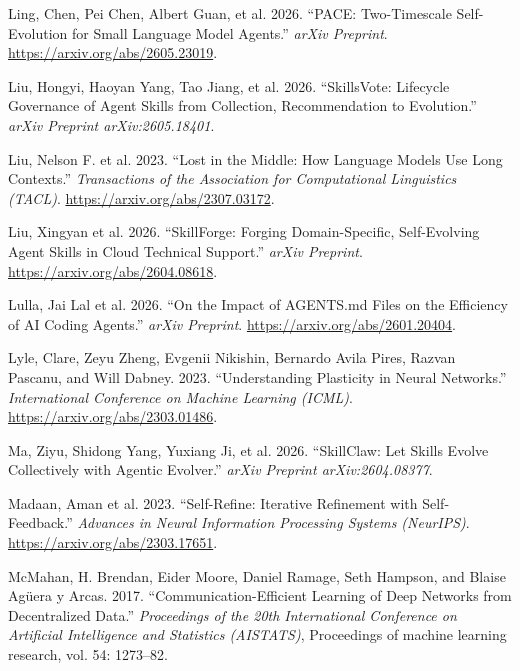 \documentclass[
]{article}
\newlength{\cslhangindent}
\newenvironment{CSLReferences}[2] %
 {\begin{list}{}{%
  \setlength{\itemindent}{0pt}
  \setlength{\leftmargin}{0pt}
  \setlength{\parsep}{0pt}
  \ifodd #1
   \setlength{\leftmargin}{\cslhangindent}
   \setlength{\itemindent}{-1\cslhangindent}
  \fi
  \setlength{\itemsep}{#2\baselineskip}}}
 {\end{list}}
\begin{document}
\begin{CSLReferences}{1}{1}
Ling, Chen, Pei Chen, Albert Guan, et al. 2026. {``{PACE}: Two-Timescale
Self-Evolution for Small Language Model Agents.''} \emph{arXiv
Preprint}. \url{https://arxiv.org/abs/2605.23019}.

Liu, Hongyi, Haoyan Yang, Tao Jiang, et al. 2026. {``{SkillsVote}:
Lifecycle Governance of Agent Skills from Collection, Recommendation to
Evolution.''} \emph{arXiv Preprint arXiv:2605.18401}.

{Liu, Nelson F. et al.} 2023. {``Lost in the Middle: How Language Models
Use Long Contexts.''} \emph{Transactions of the Association for
Computational Linguistics (TACL)}.
\url{https://arxiv.org/abs/2307.03172}.

{Liu, Xingyan et al.} 2026. {``{SkillForge}: Forging Domain-Specific,
Self-Evolving Agent Skills in Cloud Technical Support.''} \emph{arXiv
Preprint}. \url{https://arxiv.org/abs/2604.08618}.

{Lulla, Jai Lal et al.} 2026. {``On the Impact of {AGENTS.md} Files on
the Efficiency of {AI} Coding Agents.''} \emph{arXiv Preprint}.
\url{https://arxiv.org/abs/2601.20404}.

Lyle, Clare, Zeyu Zheng, Evgenii Nikishin, Bernardo Avila Pires, Razvan
Pascanu, and Will Dabney. 2023. {``{Understanding Plasticity in Neural
Networks}.''} \emph{International Conference on Machine Learning
(ICML)}. \url{https://arxiv.org/abs/2303.01486}.

Ma, Ziyu, Shidong Yang, Yuxiang Ji, et al. 2026. {``{SkillClaw}: Let
Skills Evolve Collectively with Agentic Evolver.''} \emph{arXiv Preprint
arXiv:2604.08377}.

{Madaan, Aman et al.} 2023. {``Self-Refine: Iterative Refinement with
Self-Feedback.''} \emph{Advances in Neural Information Processing
Systems (NeurIPS)}. \url{https://arxiv.org/abs/2303.17651}.

McMahan, H. Brendan, Eider Moore, Daniel Ramage, Seth Hampson, and
Blaise Agüera y Arcas. 2017. {``Communication-Efficient Learning of Deep
Networks from Decentralized Data.''} \emph{Proceedings of the 20th
International Conference on Artificial Intelligence and Statistics
(AISTATS)}, Proceedings of machine learning research, vol. 54: 1273--82.


\end{CSLReferences}
\end{document}
